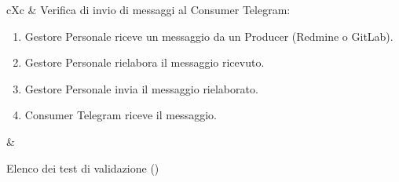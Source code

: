 \begin{table}[H]
\begin{VTtable}[1.7]{\textwidth}{cXc}
        \addtotv & Verifica di invio di messaggi al Consumer Telegram:
        \begin{enumerate}
            \item Gestore Personale riceve un messaggio da un Producer (Redmine o GitLab).
            \item Gestore Personale rielabora il messaggio ricevuto.
            \item Gestore Personale invia il messaggio rielaborato.
            \item Consumer Telegram riceve il messaggio.
        \end{enumerate}
        & \TNI \\
        \bottomrule
	\end{VTtable}
	\caption{Elenco dei test di validazione (\thetableCounter)}
\end{table}

